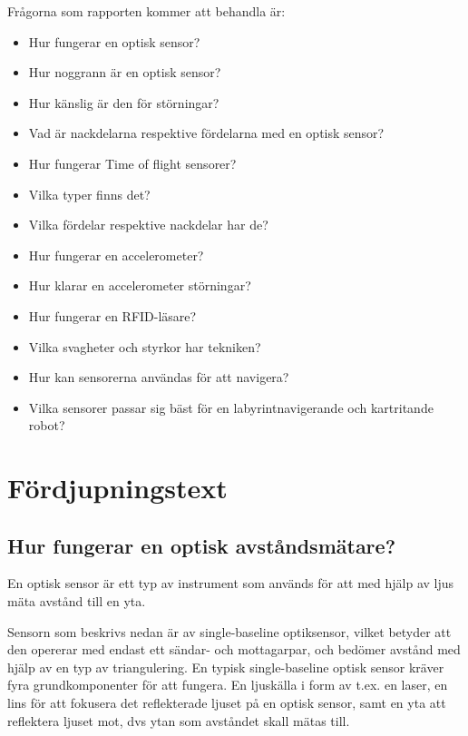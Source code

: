\documentclass[a4paper,12pt,fleqn]{article}
\begin{document}
Frågorna som rapporten kommer att behandla är:
\begin{itemize}

\item Hur fungerar en optisk sensor? 
\item Hur noggrann är en optisk sensor?
\item Hur känslig är den för störningar?
\item Vad är nackdelarna respektive fördelarna med en optisk sensor?

\item Hur fungerar Time of flight sensorer?
\item Vilka typer finns det?
\item Vilka fördelar respektive nackdelar har de?

\item Hur fungerar en accelerometer? 
\item Hur klarar en accelerometer störningar?

\item Hur fungerar en RFID-läsare?
\item Vilka svagheter och styrkor har tekniken?

\item Hur kan sensorerna användas för att navigera?
\item Vilka sensorer passar sig bäst för en labyrintnavigerande och kartritande robot?
\end{itemize}

\section{Fördjupningstext}
\subsection{Hur fungerar en optisk avståndsmätare?}
En optisk sensor är ett typ av instrument som används för att med hjälp av ljus mäta avstånd till en yta.

Sensorn som beskrivs nedan är av single-baseline optiksensor, vilket betyder att den opererar med endast ett sändar- och mottagarpar, och bedömer avstånd med hjälp av en typ av triangulering.
En typisk single-baseline optisk sensor kräver fyra grundkomponenter för att fungera.
En ljuskälla i form av t.ex. en laser, en lins för att fokusera det reflekterade ljuset på 
en optisk sensor, samt en yta att reflektera ljuset mot, dvs ytan som avståndet skall mätas till.
\end{document}
